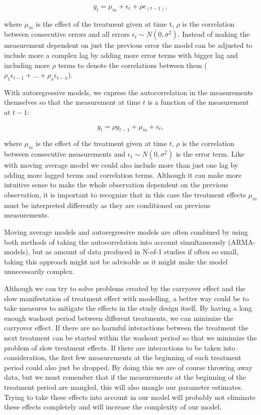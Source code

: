 \documentclass[12pt,a4paper,leqno]{report}
\theoremstyle{plain}
\theoremstyle{definition}
\theoremstyle{remark}
\begin{document}
\begin{def}\label{}
    \begin{equation}\label{movingaverage}
        y_t = \mu_m + \epsilon_t + \rho\epsilon_{(t - 1)},
    \end{equation}
\end{def}where \(\mu_m\) is the effect of the treatment given at time t, \(\rho
\) is the correlation between consecutive errors and all errors \(\epsilon_t \sim
N(0,\sigma^2) \). Instead of making the measurement dependent on just the previous error the model
can be adjusted to include more a complex lag by adding more error terms with
bigger lag and including more \(\rho \) terms to denote the correlations between
them (\(\rho_1\epsilon_{t-1} + \ldots + \rho_x\epsilon_{t-x}\)).

With autoregressive models, we express the autocorrelation in the
measurements themselves so that the measurement at time \(t\) is a function of
the measurement at \(t-1\):

\begin{def}\label{}
    \begin{equation}\label{}
        y_t = \rho y_{t-1} + \mu_m + \epsilon_t,
    \end{equation}
\end{def}where \(\mu_m\) is the effect of the treatment given at time \(t\),
\(\rho \) is the correlation between consecutive measurements and \(\epsilon_t
\sim N(0,\sigma^2)\) is the error term. Like with moving average model we could
also include more than just one lag by adding more lagged terms and correlation
terms. Although it can make more intuitive sense to make the whole observation
dependent on the previous observation, it is important to recognize that in this
case the treatment effects \(\mu_m\) must be interpreted differently as they are
conditioned on previous measurements.

Moving average models and autoregressive models are often combined by using both
methods of taking the autocorrelation into account simultaneously (ARMA-models), but as
amount of data produced in N-of-1 studies if often so small, taking this approach might not be advisable as it might make the model unnecessarily
complex.

Although we can try to solve problems created by the carryover effect and the slow
manifestation of treatment effect with modelling, a better way could be to take
measures to mitigate the effects in the study design itself. By having a long
enough washout period between different treatments, we can minimize the
carryover effect. If there are no harmful interactions between the treatment the
next treatment can be started within the washout period so that we minimize the
problem of slow treatment effects. If there are interactions to be taken into
consideration, the first few measurements at the beginning of each treatment
period could also just be dropped. By doing this we are of course throwing away
data, but we must remember that if the measurements at the beginning of the
treatment period are mangled, this will also mangle our parameter estimates.
Trying to take these effects into account in our model will probably not
eliminate these effects completely and will increase the complexity of our
model.
\end{document}
